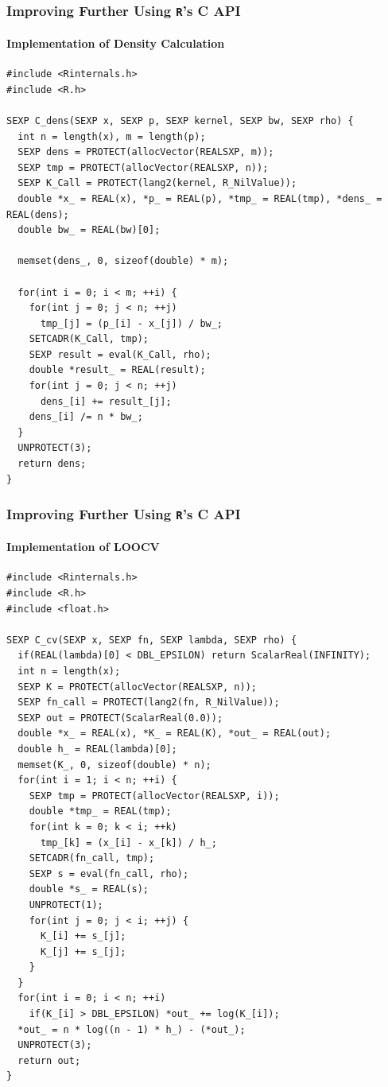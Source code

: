 \documentclass[aspectratio=169]{beamer}
\begin{document}
\begin{frame}[fragile]
  \frametitle{Improving Further Using \texttt{R}'s C API}
  \framesubtitle{Implementation of Density Calculation} 
\begin{verbatim}
#include <Rinternals.h>
#include <R.h>

SEXP C_dens(SEXP x, SEXP p, SEXP kernel, SEXP bw, SEXP rho) {
  int n = length(x), m = length(p); 
  SEXP dens = PROTECT(allocVector(REALSXP, m));
  SEXP tmp = PROTECT(allocVector(REALSXP, n));
  SEXP K_Call = PROTECT(lang2(kernel, R_NilValue));
  double *x_ = REAL(x), *p_ = REAL(p), *tmp_ = REAL(tmp), *dens_ = REAL(dens);
  double bw_ = REAL(bw)[0];
  
  memset(dens_, 0, sizeof(double) * m);
  
  for(int i = 0; i < m; ++i) {
    for(int j = 0; j < n; ++j)
      tmp_[j] = (p_[i] - x_[j]) / bw_;
    SETCADR(K_Call, tmp);
    SEXP result = eval(K_Call, rho);
    double *result_ = REAL(result);
    for(int j = 0; j < n; ++j)
      dens_[i] += result_[j];
    dens_[i] /= n * bw_;
  }
  UNPROTECT(3);
  return dens;
}
\end{verbatim}
\end{frame}
\begin{frame}[fragile]
  \frametitle{Improving Further Using \texttt{R}'s C API}
  \framesubtitle{Implementation of LOOCV}
\begin{verbatim}
#include <Rinternals.h>
#include <R.h>
#include <float.h>

SEXP C_cv(SEXP x, SEXP fn, SEXP lambda, SEXP rho) {
  if(REAL(lambda)[0] < DBL_EPSILON) return ScalarReal(INFINITY);
  int n = length(x);
  SEXP K = PROTECT(allocVector(REALSXP, n));
  SEXP fn_call = PROTECT(lang2(fn, R_NilValue));
  SEXP out = PROTECT(ScalarReal(0.0));
  double *x_ = REAL(x), *K_ = REAL(K), *out_ = REAL(out);
  double h_ = REAL(lambda)[0];
  memset(K_, 0, sizeof(double) * n);
  for(int i = 1; i < n; ++i) {
    SEXP tmp = PROTECT(allocVector(REALSXP, i));
    double *tmp_ = REAL(tmp);
    for(int k = 0; k < i; ++k)
      tmp_[k] = (x_[i] - x_[k]) / h_;
    SETCADR(fn_call, tmp);
    SEXP s = eval(fn_call, rho);
    double *s_ = REAL(s);
    UNPROTECT(1);
    for(int j = 0; j < i; ++j) {
      K_[i] += s_[j];
      K_[j] += s_[j];
    }
  }
  for(int i = 0; i < n; ++i)
    if(K_[i] > DBL_EPSILON) *out_ += log(K_[i]);
  *out_ = n * log((n - 1) * h_) - (*out_);
  UNPROTECT(3);
  return out;
}
\end{verbatim}
\end{frame}
\end{document}
